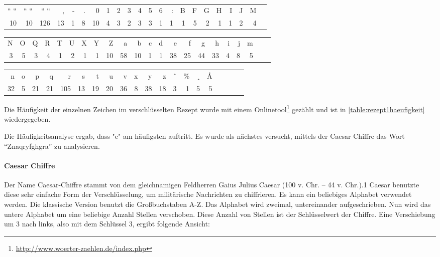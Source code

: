 \begin{table}[h]\footnotesize
\begin{tabular}{*{22}{r}}
  `` ``  &  `` ``  &  `` ``  &  ,  &  -  &  .  &  0  &  1  &  2  &  3  &  4  &  5  &  6  &  :  &  B  &  F  &  G  &  H & I & J  &  M \\
  10  &   10  &  126  &   13  &  1  &  8  &   10  &  4  &  3  &  2  &  3  &  3  &  1  &  1  &  1  &  5  &  2  &  1 & 1 & 2 & 4 \\
\end{tabular}

\begin{tabular}{*{22}{r}}
N  &  O  &  Q  &  R  &  T  &  U  &  X  &  Y  &  Z  &  a  &  b  &  c  &  d  &  e  &  f  &  g  &  h  &  i  &  j & m \\
3  &      5  &      3  &      4  &      1  &      2  &      1  &      1  &     10  &     58  &     10  &      1  &      1  &     38  &     25  &     44  &     33  &      4  &      8  &      5 \\
\end{tabular}

\begin{tabular}{*{20}{r}}
n  &  o  &  p  &  q  &  r  &  s  &  t  &  u  &  v  &  x  &  y  &  z  &  ˆ  &  \%  &  ¸  &  Å  \\
32  &      5  &     21  &     21  &    105  &     13  &     19  &     20  &     36  &      8  &     38  &     18  &      3  &      1  &      5  &      5  \\
\end{tabular}
\label{rezept1haeufigkeit}
\end{table}

Die Häufigkeit der einzelnen Zeichen im verschlüsselten Rezept wurde mit einem
Onlinetool\footnote{\url{http://www.woerter-zaehlen.de/index.php}} gezählt und
ist in \cref{table:rezept1haeufigkeit} wiedergegeben.

Die Häufigkeitsanalyse ergab, dass "e" am häufigsten auftritt.
Es wurde als nächstes versucht, mittels der Caesar Chiffre das Wort
``Znaqryfghgra'' zu analysieren.

\paragraph{Caesar Chiffre}

Der Name Caesar-Chiffre stammt von dem gleichnamigen Feldherren Gaius Julius
Caesar (100 v. Chr. – 44 v. Chr.).1 Caesar benutzte diese sehr einfache Form der
Verschlüsselung, um militärische Nachrichten zu chiffrieren.  Es kann ein
beliebiges Alphabet verwendet werden. Die klassische Version benutzt die
Großbuchstaben A-Z. Das Alphabet wird zweimal, untereinander aufgeschrieben.
Nun wird das untere Alphabet um eine beliebige Anzahl Stellen verschoben. Diese
Anzahl von Stellen ist der Schlüsselwert der Chiffre. Eine Verschiebung um 3
nach links, also mit dem Schlüssel 3, ergibt folgende Ansicht:


